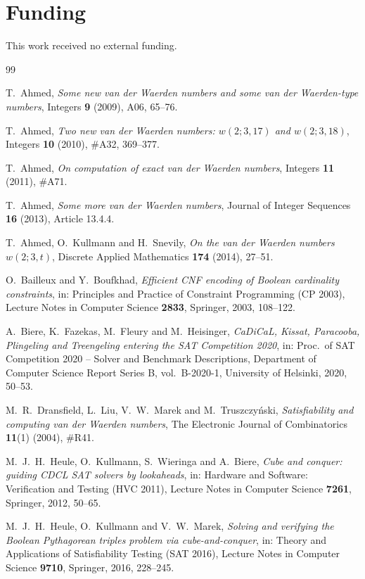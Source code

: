 \documentclass[12pt]{article}
\theoremstyle{remark}
\begin{document}
\section*{Funding}

This work received no external funding.

\begin{thebibliography}{99}

T.~Ahmed,
\emph{Some new van der Waerden numbers and some van der Waerden-type numbers},
Integers \textbf{9} (2009), A06, 65--76.

T.~Ahmed,
\emph{Two new van der Waerden numbers: $w(2;3,17)$ and $w(2;3,18)$},
Integers \textbf{10} (2010), \#A32, 369--377.

T.~Ahmed,
\emph{On computation of exact van der Waerden numbers},
Integers \textbf{11} (2011), \#A71.

T.~Ahmed,
\emph{Some more van der Waerden numbers},
Journal of Integer Sequences \textbf{16} (2013), Article 13.4.4.

T.~Ahmed, O.~Kullmann and H.~Snevily,
\emph{On the van der Waerden numbers $w(2;3,t)$},
Discrete Applied Mathematics \textbf{174} (2014), 27--51.

O.~Bailleux and Y.~Boufkhad,
\emph{Efficient CNF encoding of Boolean cardinality constraints},
in: Principles and Practice of Constraint Programming (CP 2003),
Lecture Notes in Computer Science \textbf{2833}, Springer, 2003, 108--122.

A.~Biere, K.~Fazekas, M.~Fleury and M.~Heisinger,
\emph{CaDiCaL, Kissat, Paracooba, Plingeling and Treengeling entering the
SAT Competition 2020},
in: Proc.\ of SAT Competition 2020 -- Solver and Benchmark Descriptions,
Department of Computer Science Report Series B, vol.\ B-2020-1,
University of Helsinki, 2020, 50--53.

M.~R.~Dransfield, L.~Liu, V.~W.~Marek and M.~Truszczy\'nski,
\emph{Satisfiability and computing van der Waerden numbers},
The Electronic Journal of Combinatorics \textbf{11}(1) (2004), \#R41.

M.~J.~H.~Heule, O.~Kullmann, S.~Wieringa and A.~Biere,
\emph{Cube and conquer: guiding CDCL SAT solvers by lookaheads},
in: Hardware and Software: Verification and Testing (HVC 2011),
Lecture Notes in Computer Science \textbf{7261}, Springer, 2012, 50--65.

M.~J.~H.~Heule, O.~Kullmann and V.~W.~Marek,
\emph{Solving and verifying the Boolean Pythagorean triples problem via
cube-and-conquer},
in: Theory and Applications of Satisfiability Testing (SAT 2016),
Lecture Notes in Computer Science \textbf{9710}, Springer, 2016, 228--245.


\end{thebibliography}
\end{document}
